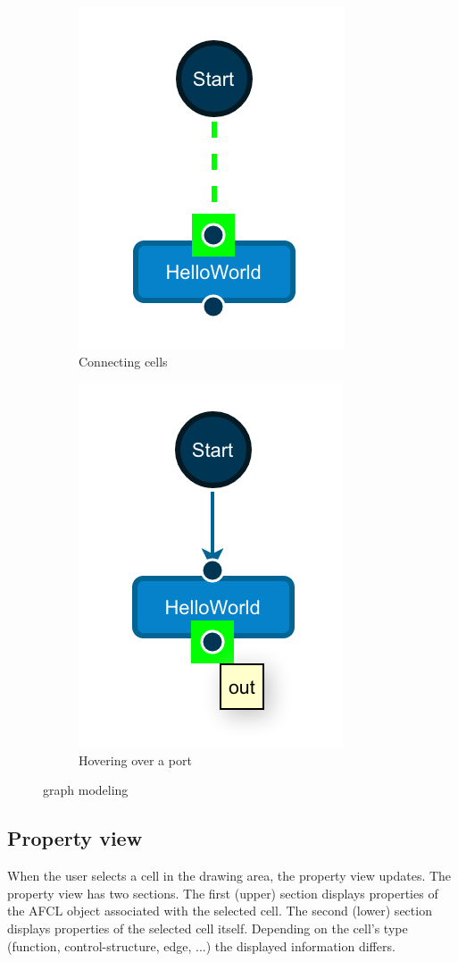 \documentclass[a4paper,top=25mm,bottom=25mm,12pt,pdftex,halfparskip,twoside,openany,bibtotoc,numbers=noenddot]{scrbook}
\begin{document}
\begin{figure}
\centering
\begin{subfigure}{.4\textwidth}
  \centering
  \includegraphics[width=.4\linewidth]{connect}
  \caption{Connecting cells}
  \label{fig:cell-behaviour-a}
\end{subfigure}
\begin{subfigure}{.4\textwidth}
  \centering
  \includegraphics[width=.4\linewidth]{port-hover}
  \caption{Hovering over a port}
  \label{fig:cell-behaviour-b}
\end{subfigure}
\caption{graph modeling}
\label{fig:cell-behaviour}
\end{figure}

\subsection{Property view}

When the user selects a cell in the drawing area, the property view updates. The property view has two sections. The first (upper) section displays properties of the AFCL object associated with the selected cell. The second (lower) section displays properties of the selected cell itself. Depending on the cell's type (function, control-structure, edge, ...) the displayed information differs.
\end{document}
